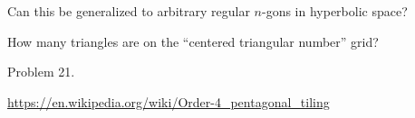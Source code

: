 \documentclass{article}
\begin{document}
\begin{related}
  \item Can this be generalized to arbitrary regular $n$-gons in hyperbolic
    space?
  \item How many triangles are on the ``centered triangular number'' grid?

\end{related}
\begin{references}
  \item Problem 21.
  \item \url{https://en.wikipedia.org/wiki/Order-4_pentagonal_tiling}
\end{references}
\end{document}
